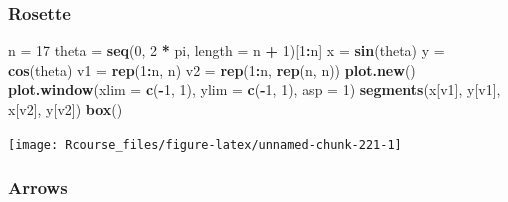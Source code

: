 \documentclass[]{book}
\newenvironment{Shaded}{\begin{snugshade}}{\end{snugshade}}
\newcommand{\KeywordTok}[1]{\textcolor[rgb]{0.13,0.29,0.53}{\textbf{#1}}}
\newcommand{\DataTypeTok}[1]{\textcolor[rgb]{0.13,0.29,0.53}{#1}}
\newcommand{\DecValTok}[1]{\textcolor[rgb]{0.00,0.00,0.81}{#1}}
\newcommand{\StringTok}[1]{\textcolor[rgb]{0.31,0.60,0.02}{#1}}
\newcommand{\OperatorTok}[1]{\textcolor[rgb]{0.81,0.36,0.00}{\textbf{#1}}}
\newcommand{\NormalTok}[1]{#1}
\theoremstyle{definition}
\theoremstyle{definition}
\theoremstyle{definition}
\theoremstyle{remark}
\begin{document}
\subsubsection{Rosette}\label{rosette}

\begin{Shaded}
\begin{Highlighting}[]
\NormalTok{n =}\StringTok{ }\DecValTok{17}
\NormalTok{theta =}\StringTok{ }\KeywordTok{seq}\NormalTok{(}\DecValTok{0}\NormalTok{, }\DecValTok{2} \OperatorTok{*}\StringTok{ }\NormalTok{pi, }\DataTypeTok{length =}\NormalTok{ n }\OperatorTok{+}\StringTok{ }\DecValTok{1}\NormalTok{)[}\DecValTok{1}\OperatorTok{:}\NormalTok{n]}
\NormalTok{x =}\StringTok{ }\KeywordTok{sin}\NormalTok{(theta)}
\NormalTok{y =}\StringTok{ }\KeywordTok{cos}\NormalTok{(theta)}
\NormalTok{v1 =}\StringTok{ }\KeywordTok{rep}\NormalTok{(}\DecValTok{1}\OperatorTok{:}\NormalTok{n, n)}
\NormalTok{v2 =}\StringTok{ }\KeywordTok{rep}\NormalTok{(}\DecValTok{1}\OperatorTok{:}\NormalTok{n, }\KeywordTok{rep}\NormalTok{(n, n))}
\KeywordTok{plot.new}\NormalTok{()}
\KeywordTok{plot.window}\NormalTok{(}\DataTypeTok{xlim =} \KeywordTok{c}\NormalTok{(}\OperatorTok{-}\DecValTok{1}\NormalTok{, }\DecValTok{1}\NormalTok{), }\DataTypeTok{ylim =} \KeywordTok{c}\NormalTok{(}\OperatorTok{-}\DecValTok{1}\NormalTok{, }\DecValTok{1}\NormalTok{), }\DataTypeTok{asp =} \DecValTok{1}\NormalTok{)}
\KeywordTok{segments}\NormalTok{(x[v1], y[v1], x[v2], y[v2])}
\KeywordTok{box}\NormalTok{()}
\end{Highlighting}
\end{Shaded}

\texttt{[image: Rcourse\_files/figure-latex/unnamed-chunk-221-1]}

\subsubsection{Arrows}\label{arrows}
\end{document}
